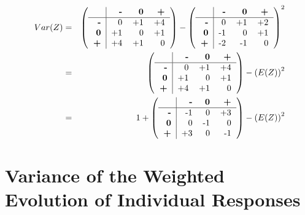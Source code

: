 \documentclass[12pt,a4paper,oneside]{book}
\begin{document}
\begin{eqnarray*}
Var(Z) &=& 
\left(\begin{tabular}{r|r r r}
                & \textbf{-} & \textbf{0} & \textbf{+} \\\hline
    \textbf{-}     & 0        & +1    & +4    \\
    \textbf{0}     & +1    & 0        & +1    \\
    \textbf{+}     & +4    & +1    & 0        \\
\end{tabular} \right)
- \left(
\begin{tabular}{r|r r r}
                & \textbf{-} & \textbf{0} & \textbf{+} \\\hline
    \textbf{-}     & 0        & +1    & +2    \\
    \textbf{0}     & -1    & 0        & +1    \\
    \textbf{+}     & -2    & -1    & 0        \\
\end{tabular}
\right)^2  \\
&=& \left( \begin{tabular}{r|r r r}
                & \textbf{-} & \textbf{0} & \textbf{+} \\\hline
    \textbf{-}     & 0        & +1    & +4    \\
    \textbf{0}     & +1    & 0        & +1    \\
    \textbf{+}     & +4    & +1    & 0        \\
\end{tabular} \right)
- \left(E(Z)\right)^2     \\
&=& 1 +  \left(\begin{tabular}{r|r r r}
                & \textbf{-} & \textbf{0} & \textbf{+} \\\hline
    \textbf{-}     & -1    & 0        & +3    \\
    \textbf{0}     & 0        & -1    & 0    \\
    \textbf{+}     & +3    & 0        & -1        \\
\end{tabular} \right)
 - \left(E(Z)\right)^2    \\
\end{eqnarray*}







\section{Variance of the Weighted Evolution of Individual Responses}
\end{document}

